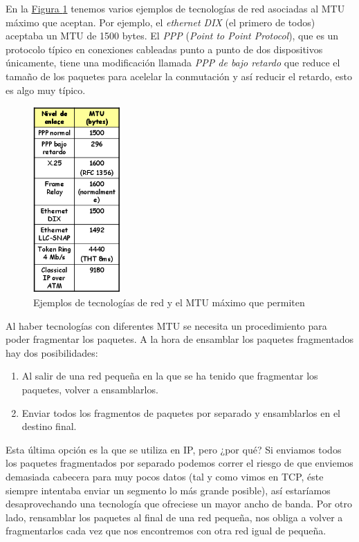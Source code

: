\documentclass[10pt,a4paper,spanish]{report}
\begin{document}
En la \hyperref[redes_mtu]{Figura \ref*{redes_mtu}} tenemos varios ejemplos de tecnologías de red asociadas al MTU máximo que aceptan. Por ejemplo, el \textit{\textcolor{tema4}{ethernet DIX}} (el primero de todos) aceptaba un MTU de 1500 bytes. El \textcolor{tema4}{\textit{PPP}} (\textit{\textcolor{tema4}{Point to Point Protocol}}), que es un protocolo típico en conexiones cableadas punto a punto de dos dispositivos únicamente, tiene una modificación llamada \textcolor{tema4}{\textit{PPP de bajo retardo}} que reduce el tamaño de los paquetes para acelelar la conmutación y así reducir el retardo, esto es algo muy típico.

\begin{figure}[!h]
  \centering
  \includegraphics[width=0.3\textwidth]{redes_mtu}
  \caption{Ejemplos de tecnologías de red y el MTU máximo que permiten}
  \label{redes_mtu}
\end{figure}

Al haber tecnologías con diferentes MTU se necesita un procedimiento para poder fragmentar los paquetes. A la hora de ensamblar los paquetes fragmentados hay dos posibilidades:

\begin{enumerate}[\color{tema4}{$\heartsuit$}]
  \item Al salir de una red pequeña en la que se ha tenido que fragmentar los paquetes, volver a ensamblarlos.

  \item Enviar todos los fragmentos de paquetes por separado y ensamblarlos en el destino final. 
\end{enumerate}

Esta última opción es la que se utiliza en IP, pero ¿por qué? Si enviamos todos los paquetes fragmentados por separado podemos correr el riesgo de que enviemos demasiada cabecera para muy pocos datos (tal y como vimos en TCP, éste siempre intentaba enviar un segmento lo más grande posible), así estaríamos desaprovechando una tecnología que ofreciese un mayor ancho de banda. Por otro lado, rensamblar los paquetes al final de una red pequeña, nos obliga a volver a fragmentarlos cada vez que nos encontremos con otra red igual de pequeña. 
\end{document}
